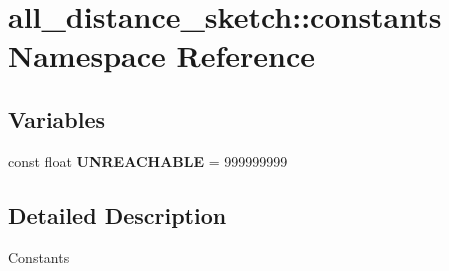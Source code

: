 \hypertarget{namespaceall__distance__sketch_1_1constants}{}\section{all\+\_\+distance\+\_\+sketch\+:\+:constants Namespace Reference}
\label{namespaceall__distance__sketch_1_1constants}
\subsection*{Variables}
\begin{DoxyCompactItemize}
\item 
\hypertarget{namespaceall__distance__sketch_1_1constants_ad55fbc1415d8bf353aaa21bd70c3077f}{}const float {\bfseries U\+N\+R\+E\+A\+C\+H\+A\+B\+L\+E} = 999999999\label{namespaceall__distance__sketch_1_1constants_ad55fbc1415d8bf353aaa21bd70c3077f}

\end{DoxyCompactItemize}


\subsection{Detailed Description}
Constants 